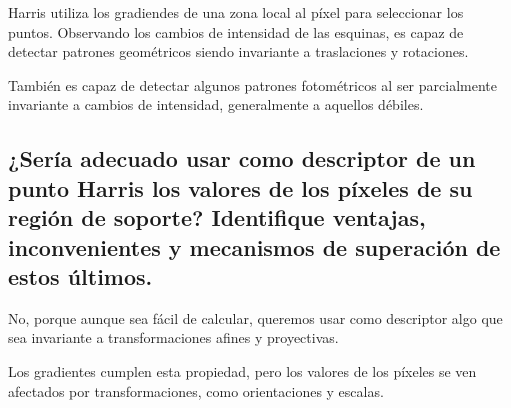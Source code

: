\documentclass[11pt]{scrartcl} %
\begin{document}

Harris utiliza los gradiendes de una zona local al píxel para seleccionar los 
puntos. Observando los cambios de intensidad de las esquinas, es capaz de detectar
patrones geométricos siendo invariante a traslaciones y rotaciones. \newline

También es capaz de detectar algunos patrones fotométricos al ser parcialmente
invariante a cambios de intensidad, generalmente a aquellos débiles.






\subsection{¿Sería adecuado usar como descriptor de un punto Harris los
valores de los píxeles de su región de soporte? Identifique
ventajas, inconvenientes y mecanismos de superación de estos
últimos.}


No, porque aunque sea fácil de calcular, queremos usar como descriptor algo
que sea invariante a transformaciones afines y proyectivas. \newline

Los gradientes cumplen esta propiedad, pero los valores de los píxeles se ven 
afectados por transformaciones, como orientaciones y escalas.


\end{document}
